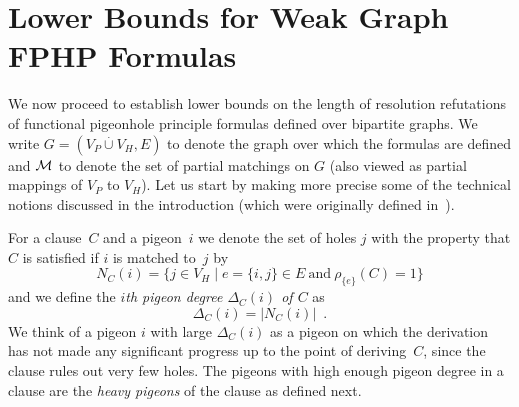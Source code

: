 \documentclass{article}
\newcommand{\set}[1]{\{ #1 \}}
\newcommand{\setdescr}[3][\mid]{\set{ #2 #1 #3 }}
\newcommand{\setsize}[1]{\lvert#1\rvert}
\newcommand{\disjointunion}{\overset{.}{\cup}}
\newcommand{\introduceterm}[1]{{\emph{#1}}}
\newcommand{\eqperiod}{\enspace .}
\newcommand{\heavy}{heavy\xspace}
\newcommand{\neigh}[2][]{N_{{#1}}(#2)}
\renewcommand{\deg}[2][XXXXXXXXXXXX]{\Delta_{#1}(#2)}
\newcommand{\V}[1][]{V_{#1}}
\newcommand{\Vp}{\V[P]}
\newcommand{\Vh}{\V[H]}
\newcommand{\matchboolof}[2]{\rho_{#1}(#2)}
\newcommand{\matchings}[1][]{\ensuremath \mathcal{M}_{{#1}}}
\numberwithin{equation}{section}
\begin{document}
 

\section{Lower Bounds for Weak Graph FPHP Formulas }
\label{sec:GFPHP}

We now proceed to establish lower bounds on the length of resolution
refutations of 
functional pigeonhole principle formulas defined over bipartite graphs.
We write
$G = (\Vp \disjointunion \Vh, E)$
to denote the graph over which the formulas are defined and $\matchings$ 
to denote
the set of partial matchings on $G$
(also viewed as partial mappings of $\Vp$ to $\Vh$).
Let us start by making more
precise some of the technical notions 
discussed in the introduction
(which were originally defined 
in~\cite{Razborov01ImprovedResolutionLowerBoundsWPHP}).


For a 
clause~$C$ and a 
pigeon~$i$ we denote the 
set of
holes $j$ with
the property that $C$ is satisfied if $i$ is matched to~$j$ by
\begin{equation}
	\neigh[C]{i} = \setdescr{ j \in \Vh }{ e=\set{i, j} \in 
	E~\text{and}~\matchboolof{\set{e}}{C} = 1 }
\end{equation}
and we define
the \introduceterm{$i$th pigeon degree 
  $\deg[C]{i}$ 
  of $C$} 
as  
\begin{equation}
  \label{eq:pig-deg}
  \deg[C]{i} 
  = \setsize{ \neigh[C]{i} } 
  \eqperiod
\end{equation}
We think
of a pigeon $i$ with large $\deg[C]{i}$ as a pigeon on which the
derivation has not made any significant progress up to the point of
deriving~$C$, since the clause rules out very few holes. 
The pigeons with high enough pigeon degree in a
clause are the \emph{\heavy pigeons} of the clause
as defined next.
\end{document}

